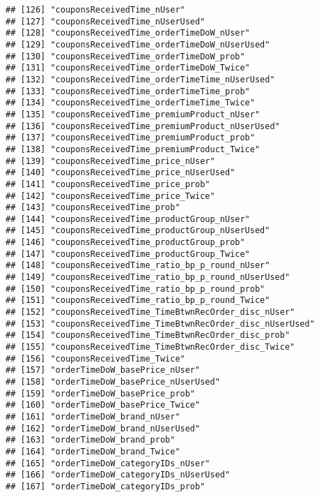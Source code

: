 \documentclass[10pt]{report}
\begin{document}
\begin{verbatim}
## [126] "couponsReceivedTime_nUser"                          
## [127] "couponsReceivedTime_nUserUsed"                      
## [128] "couponsReceivedTime_orderTimeDoW_nUser"             
## [129] "couponsReceivedTime_orderTimeDoW_nUserUsed"         
## [130] "couponsReceivedTime_orderTimeDoW_prob"              
## [131] "couponsReceivedTime_orderTimeDoW_Twice"             
## [132] "couponsReceivedTime_orderTimeTime_nUserUsed"        
## [133] "couponsReceivedTime_orderTimeTime_prob"             
## [134] "couponsReceivedTime_orderTimeTime_Twice"            
## [135] "couponsReceivedTime_premiumProduct_nUser"           
## [136] "couponsReceivedTime_premiumProduct_nUserUsed"       
## [137] "couponsReceivedTime_premiumProduct_prob"            
## [138] "couponsReceivedTime_premiumProduct_Twice"           
## [139] "couponsReceivedTime_price_nUser"                    
## [140] "couponsReceivedTime_price_nUserUsed"                
## [141] "couponsReceivedTime_price_prob"                     
## [142] "couponsReceivedTime_price_Twice"                    
## [143] "couponsReceivedTime_prob"                           
## [144] "couponsReceivedTime_productGroup_nUser"             
## [145] "couponsReceivedTime_productGroup_nUserUsed"         
## [146] "couponsReceivedTime_productGroup_prob"              
## [147] "couponsReceivedTime_productGroup_Twice"             
## [148] "couponsReceivedTime_ratio_bp_p_round_nUser"         
## [149] "couponsReceivedTime_ratio_bp_p_round_nUserUsed"     
## [150] "couponsReceivedTime_ratio_bp_p_round_prob"          
## [151] "couponsReceivedTime_ratio_bp_p_round_Twice"         
## [152] "couponsReceivedTime_TimeBtwnRecOrder_disc_nUser"    
## [153] "couponsReceivedTime_TimeBtwnRecOrder_disc_nUserUsed"
## [154] "couponsReceivedTime_TimeBtwnRecOrder_disc_prob"     
## [155] "couponsReceivedTime_TimeBtwnRecOrder_disc_Twice"    
## [156] "couponsReceivedTime_Twice"                          
## [157] "orderTimeDoW_basePrice_nUser"                       
## [158] "orderTimeDoW_basePrice_nUserUsed"                   
## [159] "orderTimeDoW_basePrice_prob"                        
## [160] "orderTimeDoW_basePrice_Twice"                       
## [161] "orderTimeDoW_brand_nUser"                           
## [162] "orderTimeDoW_brand_nUserUsed"                       
## [163] "orderTimeDoW_brand_prob"                            
## [164] "orderTimeDoW_brand_Twice"                           
## [165] "orderTimeDoW_categoryIDs_nUser"                     
## [166] "orderTimeDoW_categoryIDs_nUserUsed"                 
## [167] "orderTimeDoW_categoryIDs_prob"                      

\end{verbatim}
\end{document}
